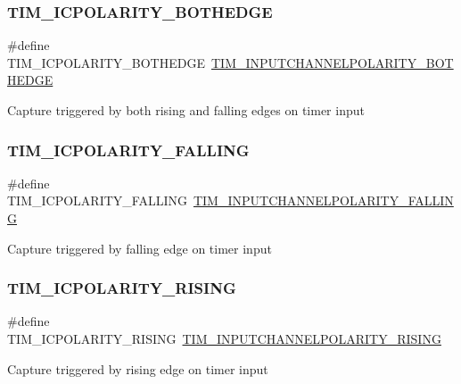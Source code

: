 \subsubsection{\texorpdfstring{TIM\_ICPOLARITY\_BOTHEDGE}{TIM\_ICPOLARITY\_BOTHEDGE}}
{\footnotesize\ttfamily \#define T\+I\+M\+\_\+\+I\+C\+P\+O\+L\+A\+R\+I\+T\+Y\+\_\+\+B\+O\+T\+H\+E\+D\+GE~\mbox{\hyperlink{group___t_i_m___input___channel___polarity_gaab2598881d1f19158e77723c5d29d6ac}{T\+I\+M\+\_\+\+I\+N\+P\+U\+T\+C\+H\+A\+N\+N\+E\+L\+P\+O\+L\+A\+R\+I\+T\+Y\+\_\+\+B\+O\+T\+H\+E\+D\+GE}}}

Capture triggered by both rising and falling edges on timer input \mbox{\label{group___t_i_m___input___capture___polarity_gaec0c00d0b749e8c18101cefcce7c32f6}} 
\subsubsection{\texorpdfstring{TIM\_ICPOLARITY\_FALLING}{TIM\_ICPOLARITY\_FALLING}}
{\footnotesize\ttfamily \#define T\+I\+M\+\_\+\+I\+C\+P\+O\+L\+A\+R\+I\+T\+Y\+\_\+\+F\+A\+L\+L\+I\+NG~\mbox{\hyperlink{group___t_i_m___input___channel___polarity_ga07441a8c0a52234e30f471c23803450c}{T\+I\+M\+\_\+\+I\+N\+P\+U\+T\+C\+H\+A\+N\+N\+E\+L\+P\+O\+L\+A\+R\+I\+T\+Y\+\_\+\+F\+A\+L\+L\+I\+NG}}}

Capture triggered by falling edge on timer input \mbox{\label{group___t_i_m___input___capture___polarity_gac79dd2a7ba97e5aac0bb9cbdc2d02ee1}} 
\subsubsection{\texorpdfstring{TIM\_ICPOLARITY\_RISING}{TIM\_ICPOLARITY\_RISING}}
{\footnotesize\ttfamily \#define T\+I\+M\+\_\+\+I\+C\+P\+O\+L\+A\+R\+I\+T\+Y\+\_\+\+R\+I\+S\+I\+NG~\mbox{\hyperlink{group___t_i_m___input___channel___polarity_ga4f4cede88a4ad4b33e81f2567e9bb08f}{T\+I\+M\+\_\+\+I\+N\+P\+U\+T\+C\+H\+A\+N\+N\+E\+L\+P\+O\+L\+A\+R\+I\+T\+Y\+\_\+\+R\+I\+S\+I\+NG}}}

Capture triggered by rising edge on timer input 